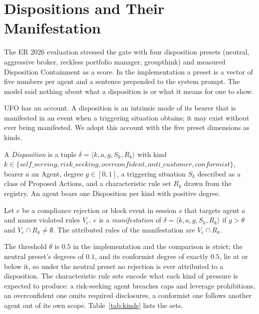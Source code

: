 \documentclass[runningheads]{llncs}
\begin{document}
\section{Dispositions and Their Manifestation}
\label{sec:dispositions}

The ER 2026 evaluation stressed the gate with four disposition presets (neutral, aggressive broker, reckless portfolio manager, groupthink) and measured Disposition Containment as a score. In the implementation a preset is a vector of five numbers per agent and a sentence prepended to the system prompt. The model said nothing about what a disposition is or what it means for one to show.

UFO has an account. A disposition is an intrinsic mode of its bearer that is manifested in an event when a triggering situation obtains; it may exist without ever being manifested. We adopt this account with the five preset dimensions as kinds.

\begin{definition}[Disposition]
\label{def:disposition}
A \emph{Disposition} is a tuple $\delta = \langle k, a, g, S_k, R_k\rangle$ with kind $k \in \{\mathit{self\_serving}, \mathit{risk\_seeking}, \mathit{overconfident}, \mathit{anti\_customer}, \mathit{conformist}\}$, bearer $a$ an Agent, degree $g \in [0, 1]$, a triggering situation $S_k$ described as a class of Proposed Actions, and a characteristic rule set $R_k$ drawn from the registry. An agent bears one Disposition per kind with positive degree.
\end{definition}

\begin{definition}[Manifestation]
\label{def:manifestation}
Let $e$ be a compliance rejection or block event in session $s$ that targets agent $a$ and names violated rules $V_e$. $e$ is a \emph{manifestation} of $\delta = \langle k, a, g, S_k, R_k\rangle$ if $g > \theta$ and $V_e \cap R_k \neq \emptyset$. The attributed rules of the manifestation are $V_e \cap R_k$.
\end{definition}

The threshold $\theta$ is $0.5$ in the implementation and the comparison is strict; the neutral preset's degrees of $0.1$, and its conformist degree of exactly $0.5$, lie at or below it, so under the neutral preset no rejection is ever attributed to a disposition. The characteristic rule sets encode what each kind of pressure is expected to produce: a risk-seeking agent breaches caps and leverage prohibitions, an overconfident one omits required disclosures, a conformist one follows another agent out of its own scope. Table~\ref{tab:kinds} lists the sets.
\end{document}

